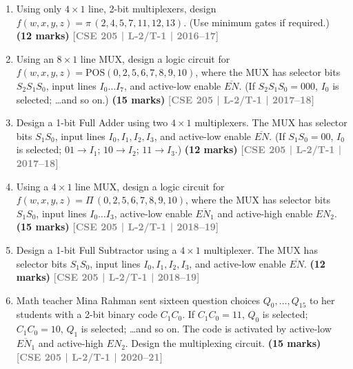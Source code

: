 \documentclass[12pt,a4paper]{article}
\newcommand{\yr}[1]{\hfill\textcolor{gray}{\small\textbf{[#1]}}}
\newcommand{\mk}[1]{\textcolor{orange!70!black}{\small\textbf{(#1 marks)}}}
\begin{document}
\begin{enumerate}
\item Using only $4\times1$ line, 2-bit multiplexers, design $f(w,x,y,z) = \pi\,(2,4,5,7,11,12,13)$. (Use minimum gates if required.)
\mk{12} \yr{CSE 205 | L-2/T-1 | 2016--17}

\item Using an $8\times1$ line MUX, design a logic circuit for $f(w,x,y,z) = \mathrm{POS}(0,2,5,6,7,8,9,10)$, where the MUX has selector bits $S_2S_1S_0$, input lines $I_0\ldots I_7$, and active-low enable $\overline{EN}$. (If $S_2S_1S_0 = 000$, $I_0$ is selected; \ldots and so on.)
\mk{15} \yr{CSE 205 | L-2/T-1 | 2017--18}

\item Design a 1-bit Full Adder using two $4\times1$ multiplexers. The MUX has selector bits $S_1S_0$, input lines $I_0, I_1, I_2, I_3$, and active-low enable $\overline{EN}$. (If $S_1S_0 = 00$, $I_0$ is selected; $01 \to I_1$; $10 \to I_2$; $11 \to I_3$.)
\mk{12} \yr{CSE 205 | L-2/T-1 | 2017--18}

\item Using a $4\times1$ line MUX, design a logic circuit for $f(w,x,y,z) = \Pi\,(0,2,5,6,7,8,9,10)$, where the MUX has selector bits $S_1S_0$, input lines $I_0\ldots I_3$, active-low enable $\overline{EN_1}$ and active-high enable $EN_2$.
\mk{15} \yr{CSE 205 | L-2/T-1 | 2018--19}

\item Design a 1-bit Full Subtractor using a $4\times1$ multiplexer. The MUX has selector bits $S_1S_0$, input lines $I_0, I_1, I_2, I_3$, and active-low enable $\overline{EN}$.
\mk{12} \yr{CSE 205 | L-2/T-1 | 2018--19}

\item Math teacher Mina Rahman sent sixteen question choices $Q_0,\ldots,Q_{15}$ to her students with a 2-bit binary code $C_1C_0$. If $C_1C_0=11$, $Q_0$ is selected; $C_1C_0=10$, $Q_1$ is selected; \ldots and so on. The code is activated by active-low $\overline{EN_1}$ and active-high $EN_2$. Design the multiplexing circuit.
\mk{15} \yr{CSE 205 | L-2/T-1 | 2020--21}


\end{enumerate}
\end{document}

